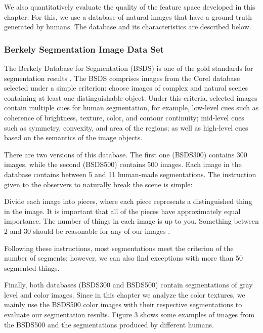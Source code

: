 We also quantitatively evaluate the quality of the feature space developed in this chapter. For this, we use a database of natural images that have a ground truth generated by humans. The database and its characteristics are described below.

\subsubsection{Berkely Segmentation Image Data Set}
The Berkely Database for Segmentation (BSDS) is one of the gold standards for segmentation results \citep{Martin.Fowlkes.ea:ICCV:2001}. The BSDS comprises images from the Corel database selected under a simple criterion: choose images of complex and natural scenes containing at least one distinguishable object. Under this criteria, selected images contain multiple cues for human segmentation, for example, low-level cues such as coherence of brightness, texture, color, and contour continuity; mid-level cues such as symmetry, convexity, and area of the regions; as well as high-level cues based on the semantics of the image objects.

There are two versions of this database. The first one (BSDS300) contains 300 images, while the second (BSDS500) contains 500 images. Each image in the database contains between 5 and 11 human-made segmentations. The instruction given to the observers to naturally break the scene is simple:
\begin{displayquote}
Divide each image into pieces, where each piece represents a distinguished thing in the image. It is important that all of the pieces have approximately equal importance. The number of things in each image is up to you. Something between 2 and 30 should be reasonable for any of our images \citep{Martin.Fowlkes.ea:ICCV:2001}.
\end{displayquote}
Following these instructions, most segmentations meet the criterion of the number of segments; however, we can also find exceptions with more than 50 segmented things.

Finally, both databases (BSDS300 and BSDS500) contain segmentations of gray level and color images. Since in this chapter we analyze the color textures, we mainly use the BSDS500 color images with their respective segmentations to evaluate our segmentation results. Figure 3 shows some examples of images from the BSDS500 and the segmentations produced by different humans.

